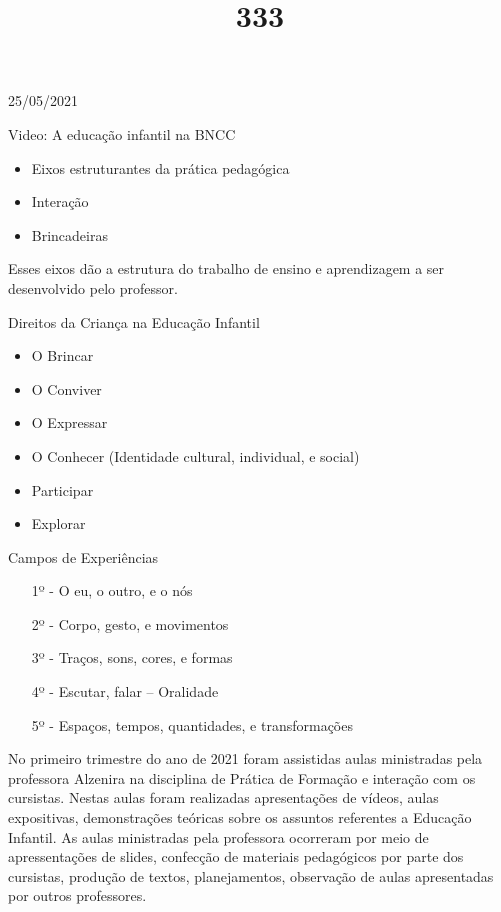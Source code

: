 \documentclass{SchoolBook}
\begin{document}
    \begin{day}{25/05/2021}
        \title{3}{Video: A educação infantil na BNCC}
        
        \begin{itemize}[nosep]
            \item Eixos estruturantes da prática pedagógica
            \item Interação
            \item Brincadeiras
        \end{itemize}
        \vspace{6pt}
        
        Esses eixos dão a estrutura do trabalho de ensino e aprendizagem a ser desenvolvido pelo professor.
        
        \title{3}{Direitos da Criança na Educação Infantil}
        
        \begin{itemize}[nosep]
            \item O Brincar
            \item O Conviver
            \item O Expressar
            \item O Conhecer (Identidade cultural, individual, e social)
            \item Participar
            \item Explorar
        \end{itemize}
        
        \title{3}{Campos de Experiências}
        
        \begin{enumerate}[nosep]
            \item[1º -] O eu, o outro, e o nós
            \item[2º -] Corpo, gesto, e movimentos
            \item[3º -] Traços, sons, cores, e formas
            \item[4º -] Escutar, falar -- Oralidade
            \item[5º -] Espaços, tempos, quantidades, e transformações
        \end{enumerate}
        
        No primeiro trimestre do ano de 2021 foram assistidas aulas ministradas pela professora Alzenira na disciplina de Prática de Formação e interação com os cursistas. Nestas aulas foram realizadas apresentações de vídeos, aulas expositivas, demonstrações teóricas sobre os assuntos referentes a Educação Infantil. As aulas ministradas pela professora ocorreram por meio de apressentações de slides, confecção de materiais pedagógicos por parte dos cursistas, produção de textos, planejamentos, observação de aulas apresentadas por outros professores.
        

\end{day}
\end{document}
